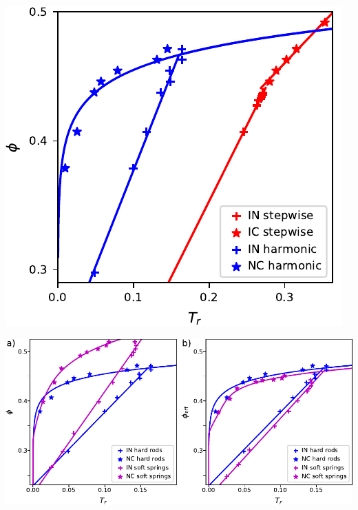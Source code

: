 \documentclass[aspectratio=169]{beamer}
\begin{document}
\begin{frame}[c]{}

  \centering
  \includegraphics[height=\textheight]{../figures/ch5_soft_from_diss/fig-harm_vs_step_phase_diag/fig-phase_diag.pdf}

\end{frame}

\begin{frame}[c]{}

  \centering
  \includegraphics[width=\textwidth]{../figures/ch5_soft_from_diss/fig-softxhard_harm_phase_diag/fig-phase_diag.pdf}

\end{frame}
\end{document}
